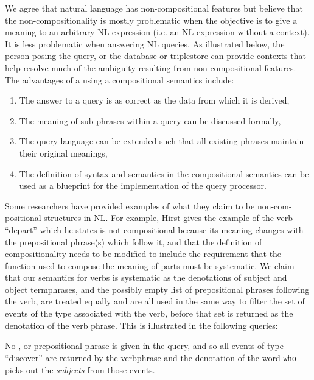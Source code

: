 \documentclass[../main.tex]{subfiles}
\begin{document}
\begin{refsection}
We agree that natural language has non-compositional features but believe that the non-compositionality is mostly problematic when the objective is to give a meaning to an arbitrary NL expression (i.e. an NL expression without a context). It is less problematic when answering NL queries. As illustrated below, the person posing the query, or the database or triplestore can provide contexts that help resolve much of the ambiguity resulting from non-compositional features. The advantages of a using a compositional semantics include:
\begin{enumerate}
	\item The answer to a query is as correct as the data from which it is derived,
	\item The meaning of sub phrases within a query can be discussed formally,
	\item The query language can be extended such that all existing phrases maintain their original meanings,
	\item The definition of syntax and semantics in the compositional semantics can be used as a blueprint for the implementation of the query processor.
\end{enumerate}
Some researchers have provided examples of what they claim to be non-com-\allowbreak positional structures in NL. For example, Hirst \cite{hirst1992semantic} gives the example of the verb ``depart'' which he states is not compositional because its meaning changes with the prepositional phrase(s) which follow it, and that the definition of compositionality needs to be modified to include the requirement that the function used to compose the meaning of parts must be systematic. We claim that our semantics for verbs is systematic as the denotations of subject and object termphrases, and the possibly empty list of prepositional phrases following the verb, are treated equally and are all used in the same way to filter the set of events of the type associated with the verb, before that set is returned as the denotation of the verb phrase. This is illustrated in the following queries:

\examplespacing


\examplespacing

\noindent No ,  or prepositional phrase is given in the query, and so all events of type ``discover'' are returned by the verbphrase and the denotation of the word \texttt{who} picks out the \textit{subjects} from those events.


\end{refsection}
\end{document}
